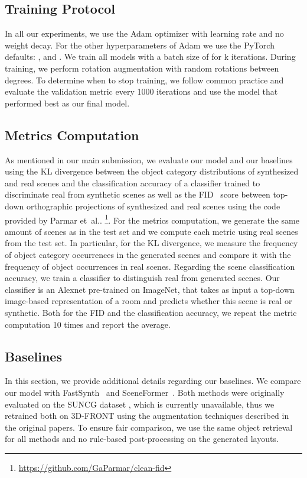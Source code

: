 \documentclass{article}
\makeatletter
\DeclareRobustCommand\onedot{\futurelet\@let@token\@onedot}
\def\@onedot{\ifx\@let@token.\else.\null\fi\xspace}
\def\etal{et~al\onedot}
\makeatother
\begin{document}
\subsection{Training Protocol}
In all our experiments, we use the Adam optimizer \cite{Kingma2015ICLR} with
learning rate  and no weight decay. For the other
hyperparameters of Adam we use the PyTorch defaults: ,  and . We train all models with a batch size of 
for k iterations. During training, we perform rotation augmentation with
random rotations between  degrees.
To determine when to stop training, we follow common practice and evaluate the
validation metric every 1000 iterations and use the model that performed
best as our final model.

\subsection{Metrics Computation}\label{subsec:evaluation_metrics}
As mentioned in our main submission, we evaluate our model and our baselines using
the KL divergence between the object category distributions of synthesized
and real scenes and the classification accuracy of a
classifier trained to discriminate real from synthetic scenes as well as the
FID~\cite{Heusel2017NIPS} score between 
top-down orthographic projections of synthesized and real scenes using the code provided by Parmar \etal
\cite{Parmar2021ARXIV}\footnote{\href{https://github.com/GaParmar/clean-fid}{https://github.com/GaParmar/clean-fid}}.
For the metrics computation, we generate the same amount of
scenes as in the test set and we compute each metric using real scenes from the
test set. In particular, for the KL divergence,  we measure the frequency of object category
occurrences in the generated scenes and compare it with the frequency of
object occurrences in real scenes. Regarding the scene classification accuracy, we
train a classifier to distinguish real from generated scenes. Our classifier is
an Alexnet \cite{Krizhevsky2012NIPS} pre-trained on ImageNet, that takes as
input a  top-down image-based representation of a room and predicts whether this
scene is real or synthetic. Both for the FID and the classification accuracy,
we repeat the metric computation 10 times and report the average.

\subsection{Baselines}

In this section, we provide additional details regarding our baselines. We
compare our model with FastSynth~\cite{Ritchie2019CVPR} and
SceneFormer~\cite{Wang2020ARXIV}. Both methods were originally
evaluated on the SUNCG dataset \cite{Song2017CVPR}, which is currently
unavailable, thus we retrained both on 3D-FRONT using the augmentation
techniques described in the original papers. To ensure fair comparison, we use
the same object retrieval for all methods and no rule-based post-processing on
the generated layouts.
\end{document}
